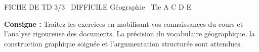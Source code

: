 \documentclass[11pt]{article}
\begin{document}
\begin{tcolorbox}[enhanced,colback=popink,colframe=popink,arc=10pt,boxrule=0pt,left=12pt,right=12pt,top=9pt,bottom=9pt]
{\color{white}\popxbold\small FICHE DE TD 3/3 \textbullet\ DIFFICILE \hfill Géographie \textbullet\ Tle A C D E\par}
\end{tcolorbox}
\vspace{4pt}
\noindent\textbf{Consigne :} Traitez les exercices en mobilisant vos connaissances du cours et l'analyse rigoureuse des documents. La précision du vocabulaire géographique, la construction graphique soignée et l'argumentation structurée sont attendues.
\end{document}
